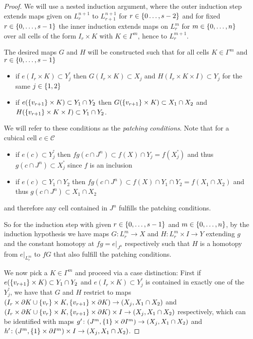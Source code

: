 \begin{prop}
\begin{proof}
        We will use a nested induction argument, where the outer induction step extends maps given on $L_r^{n+1}$ to $L_{r+1}^{n+1}$ for $r\in\left\lbrace0\ldots,s-2\right\rbrace$ and for fixed $r\in\left\lbrace0,\ldots,s-1\right\rbrace$ the inner induction extends maps on $L_r^m$ for $m\in\left\lbrace0,\ldots,n\right\rbrace$ over all cells of the form $I_r\times K$ with $K\in\Gamma^m$, hence to $L_r^{m+1}$.
        
        The desired maps $G$ and $H$ will be constructed such that for all cells $K\in\Gamma^m$ and $r\in\left\lbrace0,\ldots,s-1\right\rbrace$
        \begin{itemize}
            \item if $e(I_r\times K)\subset Y_j^°$ then $G(I_r\times K)\subset X_j$ and $H(I_r\times K\times I)\subset Y_j$ for the same $j\in\left\lbrace1,2\right\rbrace$
            \item if $e(\left\lbrace v_{r+1}\right\rbrace\times K)\subset Y_1\cap Y_2$ then $G(\left\lbrace v_{r+1}\right\rbrace\times K)\subset X_1\cap X_2$ and $H(\left\lbrace v_{r+1}\right\rbrace\times K\times I)\subset Y_1\cap Y_2$.
        \end{itemize}
        We will refer to these conditions as the \emph{patching conditions}.
        Note that for a cubical cell $c\in\mathcal{C}$ 
        \begin{itemize}
            \item if $e(c)\subset Y_j^°$ then $fg(c\cap J^n)\subset f(X)\cap Y_j=f(X_j^°)$ and thus $g(c\cap J^n)\subset X_j^°$ since $f$ is an inclusion
            \item if $e(c)\subset Y_1\cap Y_2$ then $fg(c\cap J^n)\subset f(X)\cap Y_1\cap Y_2=f(X_1\cap X_2)$ and thus $g(c\cap J^n)\subset X_1\cap X_2$
        \end{itemize}
        and therefore any cell contained in $J^n$ fulfills the patching conditions.
        
        So for the induction step with given $r\in\left\lbrace0,\ldots,s-1\right\rbrace$ and $m\in\left\lbrace0,\ldots,n\right\rbrace$, by the induction hypothesis we have maps $G\colon L_r^m\to X$ and $H\colon L_r^m\times I\to Y$ extending $g$ and the constant homotopy at $fg=e|_{J^n}$ respectively such that $H$ is a homotopy from $e|_{L_r^m}$ to $fG$ that also fulfill the patching conditions.

        We now pick a $K\in\Gamma^m$ and proceed via a case distinction:
        First if $e(\left\lbrace v_{r+1}\right\rbrace\times K)\subset Y_1\cap Y_2$ and $e(I_r\times K)\subset Y_j^°$ is contained in exactly one of the $Y_j^°$, we have that $G$ and $H$ restrict to maps $(I_r\times\partial K\cup\left\lbrace v_r\right\rbrace\times K, \left\lbrace v_{r+1}\right\rbrace\times\partial K)\to(X_j,X_1\cap X_2)$ and $(I_r\times\partial K\cup\left\lbrace v_r\right\rbrace\times K, \left\lbrace v_{r+1}\right\rbrace\times\partial K)\times I\to(X_j,X_1\cap X_2)$ respectively, which can be identified with maps $g'\colon(J^m, \left\lbrace1\right\rbrace\times\partial{I^m})\to(X_j,X_1\cap X_2)$ and $h'\colon (J^m, \left\lbrace1\right\rbrace\times\partial{I^m})\times I\to(X_j,X_1\cap X_2)$.
        

\end{proof}
\end{prop}
